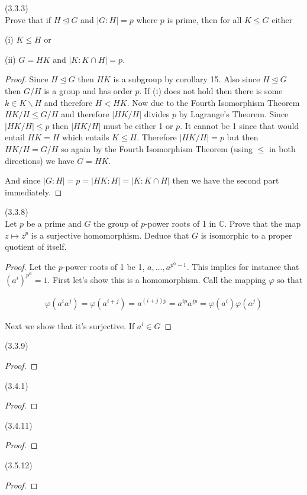 \documentclass{exam}
\begin{document}
\begin{questions}
\question(3.3.3)\\
Prove that if $H\trianglelefteq G$ and $|G:H| = p$ where $p$ is prime, then for all $K\leq G$ either

(i) $K\leq H$ or

(ii) $G=HK$ and $|K:K\cap H|=p$.

\begin{proof}
  Since $H\trianglelefteq G$ then $HK$ is a subgroup by corollary 15.  Also since $H\trianglelefteq G$ then $G/H$ is a group and has order $p$.  If (i) does not hold then there is some $k\in K\smallsetminus H$ and therefore $H < HK$.  Now due to the Fourth Isomorphism Theorem $HK/H \leq G/H$ and therefore $|HK/H|$ divides $p$ by Lagrange's Theorem.  Since $|HK/H|\leq p$ then $|HK/H|$ must be either 1 or $p$.  It cannot be 1 since that would entail $HK = H$ which entails $K\leq H$.  Therefore $|HK/H|=p$ but then $HK/H=G/H$ so again by the Fourth Isomorphism Theorem (using $\leq$ in both directions) we have $G=HK$.

  And since $|G:H|=p=|HK:H|=|K:K\cap H|$ then we have the second part immediately.
\end{proof}

\question(3.3.8)\\
Let $p$ be a prime and $G$ the group of $p$-power roots of 1 in $\mathbb C$.  Prove that the map $z\mapsto z^p$ is a surjective homomorphism.  Deduce that $G$ is isomorphic to a proper quotient of itself.

\begin{proof}
  Let the $p$-power roots of 1 be 1, $a, \dots, a^{p^\alpha-1}$.  This implies for instance that $(a^i)^{p^\alpha}=1$.  First let's show this is a homomorphism.  Call the mapping $\varphi$ so that

  \begin{align*}
    \varphi(a^ia^j) = \varphi(a^{i+j}) = a^{(i+j)p} = a^{ip}a^{jp} = \varphi(a^i)\varphi(a^j)
  \end{align*}

  Next we show that it's surjective.  If $a^i\in G$ 
\end{proof}

\question(3.3.9)\\

\begin{proof}
\end{proof}

\question(3.4.1)\\

\begin{proof}
\end{proof}

\question(3.4.11)\\

\begin{proof}
\end{proof}

\question(3.5.12)\\

\begin{proof}
\end{proof}


\end{questions}
\end{document}

